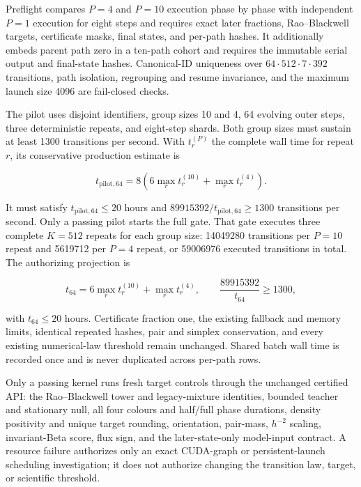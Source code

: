 \documentclass[11pt]{article}
\numberwithin{equation}{section}
\newcommand{\1}{\mathbf 1}
\begin{document}
Preflight compares $P=4$ and $P=10$ execution phase by phase with independent
$P=1$ execution for eight steps and requires exact later fractions,
Rao--Blackwell targets, certificate masks, final states, and per-path hashes.
It additionally embeds parent path zero in a ten-path cohort and requires
the immutable serial output and final-state hashes.  Canonical-ID uniqueness
over $64\cdot512\cdot7\cdot392$ transitions, path isolation, regrouping and
resume invariance, and the maximum launch size 4096 are fail-closed checks.

The pilot uses disjoint identifiers, group sizes 10 and 4, 64 evolving
outer steps, three deterministic repeats, and eight-step shards.  Both group
sizes must sustain at least 1300 transitions per second.  With $t^{(P)}_r$
the complete wall time for repeat $r$, its conservative production estimate
is

\begin{equation}
  t_{\mathrm{pilot},64}
  =8\left(6\max_r t^{(10)}_r+\max_r t^{(4)}_r\right).
  \label{eq:d0-jacobi-multipath-pilot-projection}
\end{equation}

It must satisfy $t_{\mathrm{pilot},64}\leq20$ hours and
$89915392/t_{\mathrm{pilot},64}\geq1300$ transitions per second.  Only a
passing pilot starts the full gate.  That gate executes three complete
$K=512$ repeats for each group size: 14049280 transitions per $P=10$
repeat and 5619712 per $P=4$ repeat, or 59006976 executed transitions in
total.  The authorizing projection is

\begin{equation}
  t_{64}=6\max_r t^{(10)}_r+\max_r t^{(4)}_r,
  \qquad \frac{89915392}{t_{64}}\geq1300,
  \label{eq:d0-jacobi-multipath-full-projection}
\end{equation}

with $t_{64}\leq20$ hours.  Certificate fraction one, the existing
fallback and memory limits, identical repeated hashes, pair and simplex
conservation, and every existing numerical-law threshold remain unchanged.
Shared batch wall time is recorded once and is never duplicated across
per-path rows.

Only a passing kernel runs fresh target controls through the unchanged
certified API: the Rao--Blackwell tower and legacy-mixture identities,
bounded teacher and stationary null, all four colours and half/full phase
durations, density positivity and unique target rounding, orientation,
pair-mass, $h^{-2}$ scaling, invariant-Beta score, flux sign, and the
later-state-only model-input contract.  A resource failure authorizes only
an exact CUDA-graph or persistent-launch scheduling investigation; it does
not authorize changing the transition law, target, or scientific threshold.
\end{document}
